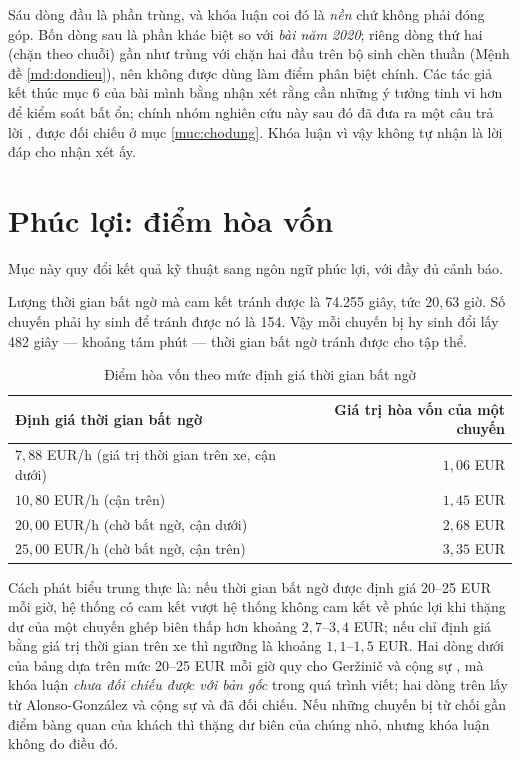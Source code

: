 Sáu dòng đầu là phần trùng, và khóa luận coi đó là \emph{nền} chứ không phải đóng góp. Bốn dòng
sau là phần khác biệt so với \emph{bài năm 2020}; riêng dòng thứ hai (chặn theo chuỗi) gần như
trùng với chặn hai đầu trên bộ sinh chèn thuần (Mệnh đề \ref{md:dondieu}), nên không được dùng
làm điểm phân biệt chính. Các tác giả kết thúc mục 6 của bài mình bằng nhận xét rằng cần những ý
tưởng tinh vi hơn để kiểm soát bất ổn; chính nhóm nghiên cứu này sau đó đã đưa ra một câu trả lời
\cite{elmi2026}, được đối chiếu ở mục \ref{muc:chodung}. Khóa luận vì vậy không tự nhận là lời đáp
cho nhận xét ấy.

\section{Phúc lợi: điểm hòa vốn}
\label{muc:phucloi}

Mục này quy đổi kết quả kỹ thuật sang ngôn ngữ phúc lợi, với đầy đủ cảnh báo.

Lượng thời gian bất ngờ mà cam kết tránh được là 74.255 giây, tức $20{,}63$ giờ. Số chuyến phải
hy sinh để tránh được nó là 154. Vậy mỗi chuyến bị hy sinh đổi lấy 482 giây --- khoảng tám phút
--- thời gian bất ngờ tránh được cho tập thể.

\begin{table}[htbp]
\centering
\caption{Điểm hòa vốn theo mức định giá thời gian bất ngờ}
\label{bang:hoavon}
\small
\begin{tabular}{@{}lr@{}}
\toprule
\textbf{Định giá thời gian bất ngờ} & \textbf{Giá trị hòa vốn của một chuyến}\\
\midrule
$7{,}88$ EUR/h (giá trị thời gian trên xe, cận dưới) & $1{,}06$ EUR\\
$10{,}80$ EUR/h (cận trên) & $1{,}45$ EUR\\
$20{,}00$ EUR/h (chờ bất ngờ, cận dưới) & $2{,}68$ EUR\\
$25{,}00$ EUR/h (chờ bất ngờ, cận trên) & $3{,}35$ EUR\\
\bottomrule
\end{tabular}
\end{table}

Cách phát biểu trung thực là: nếu thời gian bất ngờ được định giá 20--25 EUR mỗi giờ, hệ thống có
cam kết vượt hệ thống không cam kết về phúc lợi khi thặng dư của một chuyến ghép biên thấp hơn
khoảng $2{,}7$--$3{,}4$ EUR; nếu chỉ định giá bằng giá trị thời gian trên xe thì ngưỡng là khoảng
$1{,}1$--$1{,}5$ EUR. Hai dòng dưới của bảng dựa trên mức 20--25 EUR mỗi giờ quy cho Geržinič và
cộng sự \cite{gerzinic2023}, mà khóa luận \emph{chưa đối chiếu được với bản gốc} trong quá trình
viết; hai dòng trên lấy từ Alonso-González và cộng sự \cite{alonsogonzalez2020} và đã đối chiếu. Nếu những
chuyến bị từ chối gần điểm bàng quan của khách thì thặng dư biên của chúng nhỏ, nhưng khóa luận
không đo điều đó.

